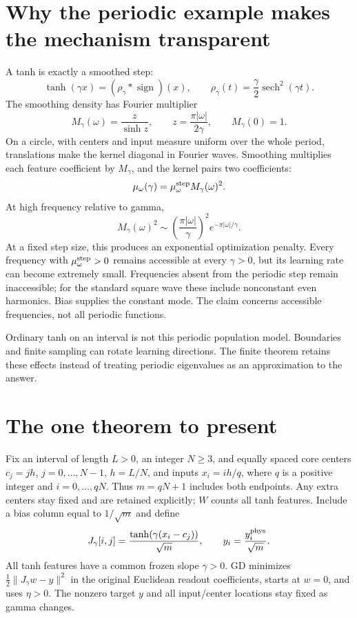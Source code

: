 \documentclass[11pt]{article}
\DeclareMathOperator{\sech}{sech}
\DeclareMathOperator{\sign}{sign}
\theoremstyle{definition}
\begin{document}
\section{Why the periodic example makes the mechanism transparent}
A tanh is exactly a smoothed step:
\[
\tanh(\gamma x)=(\rho_\gamma*\sign)(x),\qquad
\rho_\gamma(t)=\frac\gamma2\sech^2(\gamma t).
\]
The smoothing density has Fourier multiplier
\[
M_\gamma(\omega)=\frac z{\sinh z},\qquad
z=\frac{\pi|\omega|}{2\gamma},\qquad M_\gamma(0)=1.
\]
On a circle, with centers and input measure uniform over the whole period,
translations make the kernel diagonal in Fourier waves. Smoothing multiplies
each feature coefficient by $M_\gamma$, and the kernel pairs two coefficients:
\[
\mu_\omega(\gamma)=\mu_\omega^{\rm step}M_\gamma(\omega)^2.
\]
At high frequency relative to gamma,
\[
M_\gamma(\omega)^2\sim
\left(\frac{\pi|\omega|}{\gamma}\right)^2e^{-\pi|\omega|/\gamma}.
\]
At a fixed step size, this produces an exponential optimization penalty.
Every frequency with
$\mu_\omega^{\rm step}>0$ remains accessible at every $\gamma>0$, but its
learning rate can become extremely small. Frequencies absent from the
periodic step remain inaccessible; for the standard square wave these
include nonconstant even harmonics. Bias supplies the constant mode. The
claim concerns accessible frequencies, not all periodic functions.

Ordinary tanh on an interval is not this periodic population model.
Boundaries and finite sampling can rotate learning directions. The finite
theorem retains these effects instead of treating periodic eigenvalues as
an approximation to the answer.

\section{The one theorem to present}
Fix an interval of length $L>0$, an integer $N\ge3$, and equally spaced core centers $c_j=jh$,
$j=0,\ldots,N-1$, $h=L/N$, and inputs $x_i=ih/q$, where $q$ is a positive
integer and $i=0,\ldots,qN$. Thus $m=qN+1$ includes both endpoints.
Any extra centers stay fixed and are retained explicitly; $W$ counts all
tanh features. Include a bias column equal to $1/\sqrt m$ and define
\[
J_\gamma[i,j]=\frac{\tanh(\gamma(x_i-c_j))}{\sqrt m},\qquad
y_i=\frac{y_i^{\rm phys}}{\sqrt m}.
\]
All tanh features have a common frozen slope $\gamma>0$.
GD minimizes $\frac12\|J_\gamma w-y\|^2$ in the original Euclidean
readout coefficients, starts at $w=0$, and uses $\eta>0$.
The nonzero target $y$ and all input/center locations stay fixed as gamma
changes.
\end{document}
